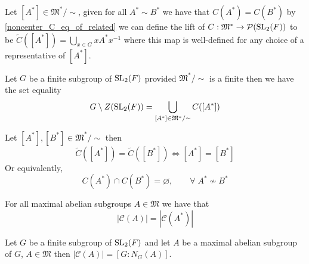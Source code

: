 \begin{definition}
\label{lift_noncenter_C}
\leanok
 Let $[A^*] \in \mathfrak{M}^* / \sim$, given for all $A^* \sim B^*$ we have that $C(A^*) = C(B^*)$ by \ref{noncenter_C_eq_of_related} we can define the lift of $C : \mathfrak{M}^* \rightarrow \mathcal{P}(\operatorname{SL}_2(F))$ to be 
  $\tilde{C}([A^*]) = \bigcup_{x \in G} x A^* x^{-1}$ where this map is well-defined for any choice of a representative of $[A^*]$.
\end{definition}

\begin{theorem}
\label{union_lift_noncenter_C_eq_G_diff_center}
  Let $G$ be a finite subgroup of $\operatorname{SL}_2(F)$ provided $\mathfrak{M}^* / \sim$ is a finite then we have the set equality
  \[
   G \setminus Z(\operatorname{SL}_2(F)) = \bigcup_{[A^*] \in \mathfrak{M}^* / \sim} C([A^*])
  \]
\end{theorem}

\begin{theorem}
  \label{disjoint_of_ne_lift_noncenter_MaximalAbelianSubgroupsOf}
  Let $[A^*], [B^*] \in \mathfrak{M}^* / \sim$ then
  \[
  \tilde{C}([A^*]) = \tilde{C}([B^*]) \iff [A^*] = [B^*]
  \]
  Or equivalently,
  \[ 
  C(A^*) \cap C(B^*) = \varnothing, \qquad \forall \;  A^* \not\sim B^* 
  \]
\end{theorem}

\begin{theorem}
  \label{card_noncenter_ConjClassOfSet_eq_card_ConjClassOfSet}
  For all maximal abelian subgroups $A \in \mathfrak{M}$ we have that 
  \[
  |\mathcal{C}(A)| = |\mathcal{C}(A^*)|
  \]
\end{theorem}


\begin{theorem}
\label{card_ConjClassOfSet_eq_index_normalizer}

Let $G$ be a finite subgroup of $\operatorname{SL}_2(F)$ and let $A$ be a maximal abelian subgroup of $G$, 
$A \in \mathfrak{M}$ then $|\mathcal{C}(A)| = [G : N_G(A)]$.
\end{theorem}


